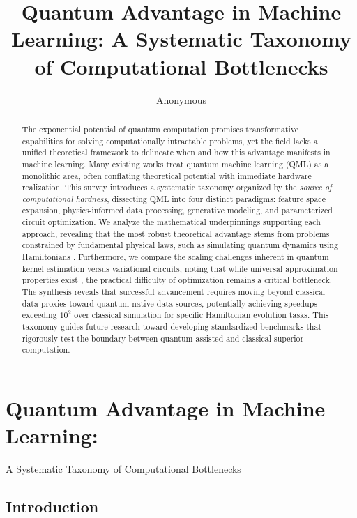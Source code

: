 \documentclass{article}
\title{Quantum Advantage in Machine Learning: A Systematic Taxonomy of Computational Bottlenecks}
\author{Anonymous}
\begin{document}
\begin{abstract}
The exponential potential of quantum computation promises transformative capabilities for solving computationally intractable problems, yet the field lacks a unified theoretical framework to delineate when and how this advantage manifests in machine learning. Many existing works treat quantum machine learning (QML) as a monolithic area, often conflating theoretical potential with immediate hardware realization. This survey introduces a systematic taxonomy organized by the \textit{source of computational hardness}, dissecting QML into four distinct paradigms: feature space expansion, physics-informed data processing, generative modeling, and parameterized circuit optimization. We analyze the mathematical underpinnings supporting each approach, revealing that the most robust theoretical advantage stems from problems constrained by fundamental physical laws, such as simulating quantum dynamics using Hamiltonians \cite{kuhne2020electronic}. Furthermore, we compare the scaling challenges inherent in quantum kernel estimation versus variational circuits, noting that while universal approximation properties exist \cite{goto2021universal}, the practical difficulty of optimization remains a critical bottleneck. The synthesis reveals that successful advancement requires moving beyond classical data proxies toward quantum-native data sources, potentially achieving speedups exceeding $10^2$ over classical simulation for specific Hamiltonian evolution tasks. This taxonomy guides future research toward developing standardized benchmarks that rigorously test the boundary between quantum-assisted and classical-superior computation.
\end{abstract}

\maketitle

\section{Quantum Advantage in Machine Learning:}

\label{sec:quantum\_advantage\_in\_machine\_learning}

A Systematic Taxonomy of Computational Bottlenecks

\subsection{Introduction}
\end{document}
